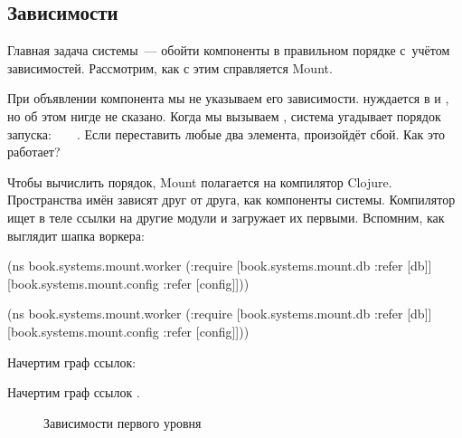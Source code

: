 \subsection{Зависимости}


Главная задача системы~--- обойти компоненты в правильном порядке с~учётом
зависимостей. Рассмотрим, как с этим справляется Mount.

При объявлении компонента мы не указываем его зависимости. 
нуждается в  и , но об этом нигде не сказано. Когда мы
вызываем , система угадывает порядок запуска:
~\arr{} ~\arr{} . Если переставить любые два
элемента, произойдёт сбой. Как это работает?

Чтобы вычислить порядок, Mount полагается на компилятор Clojure. Пространства
имён зависят друг от друга, как компоненты системы. Компилятор ищет в теле
 ссылки на другие модули и загружает их первыми. Вспомним, как выглядит
шапка воркера:

\ifafive

\begin{clojure}
(ns book.systems.mount.worker
  (:require
   [book.systems.mount.db :refer [db]]
   [book.systems.mount.config :refer [config]]))
\end{clojure}

\else

\begin{clojure}
(ns book.systems.mount.worker
  (:require
   [book.systems.mount.db :refer [db]]
   [book.systems.mount.config
     :refer [config]]))
\end{clojure}

\fi


\ifprint

\noindent
Начертим граф ссылок:

\begin{figure}[h!]
\end{figure}

\fi

\ifebook

\noindent
Начертим граф ссылок .

\begin{figure}[ht!]
  \caption{Зависимости первого уровня}
  \label{fig:chart-sys-2}
\end{figure}

